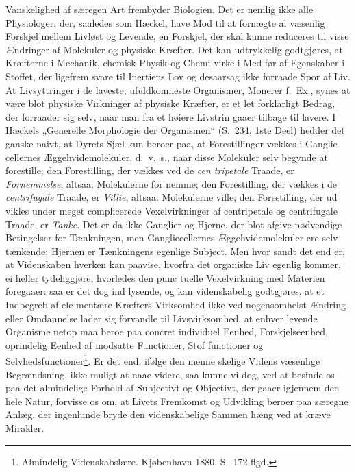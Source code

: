 \documentclass[12pt,a4paper]{article}
\newcommand{\opage}[1]{\marginnote{\footnotesize\textit{[#1]}}}
\begin{document}
Vanskelighed af særegen Art frembyder Biologien. Det er
nemlig ikke alle Physiologer, der, saaledes som Hæckel, have Mod
til at fornægte al væsenlig Forskjel mellem Livløst og Levende,
en Forskjel, der skal kunne reduceres til visse Ændringer af
Molekuler og physiske Kræfter. Det kan udtrykkelig godtgjøres,
at Kræfterne i Mechanik, chemisk Physik og Chemi virke i Med\-%
\opage{40}før af Egenskaber i Stoffet, der ligefrem svare til Inertiens Lov
og desaarsag ikke forraade Spor af Liv. At Livsyttringer i de
laveste, ufuldkomneste Organismer, Monerer f.\ Ex., synes at være
blot physiske Virkninger af physiske Kræfter, er et let forklarligt
Bedrag, der forraader sig selv, naar man fra et høiere Livstrin
gaaer tilbage til lavere. I Hæckels „Generelle Morphologie der
Organismen“ (S.\ 234, 1ste Deel) hedder det ganske naivt, at
Dyrets Sjæl kun beroer paa, at Forestillinger vækkes i Ganglie\-%
cellernes Æggehvidemolekuler, d.\ v.\ s., naar disse Molekuler selv
begynde at forestille; den Forestilling, der vækkes ved de \emph{cen\-%
tripetale} Traade, er \emph{Fornemmelse}, altsaa: Molekulerne for\-%
nemme; den Forestilling, der vækkes i de \emph{centrifugale} Traade,
er \emph{Villie}, altsaa: Molekulerne ville; den Forestilling, der ud\-%
vikles under meget complicerede Vexelvirkninger af centripetale
og centrifugale Traade, er \emph{Tanke}. Det er da ikke Ganglier og
Hjerne, der blot afgive nødvendige Betingelser for Tænkningen,
men Gangliecellernes Æggehvidemolekuler ere selv tænkende:
Hjernen er Tænkningens egenlige Subject. Men hvor sandt det
end er, at Videnskaben hverken kan paavise, hvorfra det organiske
Liv egenlig kommer, ei heller tydeliggjøre, hvorledes den punc\-%
tuelle Vexelvirkning med Materien foregaaer: saa er det dog ind\-%
lysende, og kan videnskabelig godtgjøres, at et Indbegreb af ele\-%
mentære Kræfters Virksomhed ikke ved nogensomhelst Ændring
eller Omdannelse lader sig forvandle til Livsvirksomhed, at enhver
levende Organisme netop maa beroe paa concret individuel Eenhed,
Forskjelseenhed, oprindelig Eenhed af modsatte Functioner, Stof\-%
functioner og Selvhedsfunctioner\footnote{Almindelig Videnskabslære. Kjøbenhavn 1880. S.\ 172 flgd.}. %
Er det end, ifølge den menne\-%
skelige Videns væsenlige Begrændsning, ikke muligt at naae videre,
saa kunne vi dog, ved at besinde os paa det almindelige Forhold
af Subjectivt og Objectivt, der gaaer igjennem den hele Natur,
forvisse os om, at Livets Fremkomst og Udvikling beroer paa
særegne Anlæg, der ingenlunde bryde den videnskabelige Sammen\-%
hæng ved at kræve Mirakler.
\end{document}

